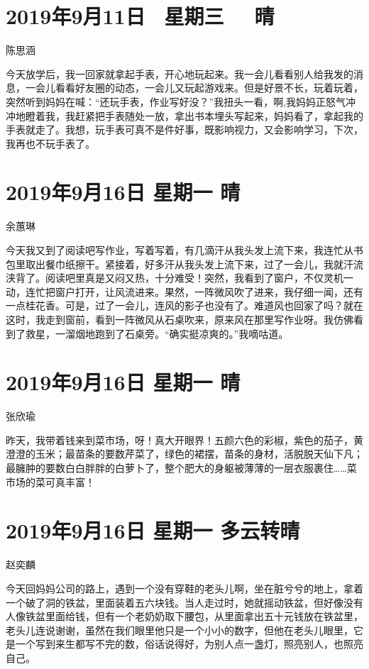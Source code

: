 \section{2019年9月11日~ 星期三~~ 晴}

陈思涵

今天放学后，我一回家就拿起手表，开心地玩起来。我一会儿看看别人给我发的消息，一会儿看看好友圈的动态，一会儿又玩起游戏来。但是好景不长，玩着玩着，突然听到妈妈在喊：``还玩手表，作业写好没？''我扭头一看，啊,我妈妈正怒气冲冲地瞪着我，我赶紧把手表随处一放，拿出书本埋头写起来，妈妈看了，拿起我的手表就走了。我想，玩手表可真不是件好事，既影响视力，又会影响学习，下次，我再也不玩手表了。

\section{2019年9月16日 星期一 晴}

余蕙琳

今天我又到了阅读吧写作业，写着写着，有几滴汗从我头发上流下来，我连忙从书包里取出餐巾纸擦干。紧接着，好多汗从我头发上流下来，过了一会儿，我就汗流浃背了。阅读吧里真是又闷又热，十分难受！突然，我看到了窗户，不仅灵机一动，连忙把窗户打开，让风流进来。果然，一阵微风吹了进来，我仔细一闻，还有一点桂花香。可是，过了一会儿，连风的影子也没有了。难道风也回家了吗？就在这时，我走到窗前，看到一阵微风从石桌吹来，原来风在那里写作业呀。我仿佛看到了救星，一溜烟地跑到了石桌旁。“确实挺凉爽的。”我嘀咕道。

\section{2019年9月16日 星期一 晴}

张欣瑜

昨天，我带着钱来到菜市场，呀！真大开眼界！五颜六色的彩椒，紫色的茄子，黄澄澄的玉米；最苗条的要数芹菜了，绿色的裙摆，苗条的身材，活脱脱天仙下凡；最臃肿的要数白白胖胖的白萝卜了，整个肥大的身躯被薄薄的一层衣服裹住\ldots{}\ldots{}菜市场的菜可真丰富！

\section{2019年9月16日 星期一 多云转晴}

赵奕麟

今天回妈妈公司的路上，遇到一个没有穿鞋的老头儿啊，坐在脏兮兮的地上，拿着一个破了洞的铁盆，里面装着五六块钱。当人走过时，她就摇动铁盆，但好像没有人像铁盆里面给钱，但有一个老奶奶取下腰包，从里面拿出五十元钱放在铁盆里，老头儿连说谢谢，虽然在我们眼里他只是一个小小的数字，但他在老头儿眼里，它是一个写到来生都写不完的数，俗话说得好，为别人点一盏灯，照亮别人，也照亮自己。

